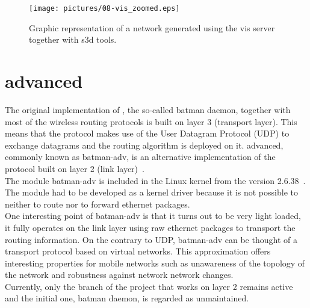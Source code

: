 \documentclass[a4paper]{article}
\begin{document}
\begin{figure}[!ht]
  \centering
  \texttt{[image: pictures/08-vis\_zoomed.eps]}
  \caption{Graphic representation of a network generated using the vis server
    together with s3d tools.}
  \label{fig:vis-server}
\end{figure}


\section{\batman  advanced}

The original implementation of \batman, the so-called batman daemon, together
with most of the wireless routing protocols is built on layer 3 (transport
layer). This means that the protocol makes use of the User Datagram Protocol 
(UDP) to exchange datagrams and the routing algorithm is deployed on it. 
\batman advanced, commonly known as batman-adv, is an alternative implementation 
of the protocol built on layer 2 (link layer)~\cite{batman-adv}.  \\

\vspace{2mm}
The module batman-adv is included in the Linux kernel from the version
2.6.38~\cite{batman-adv-kernel}. The module had to be developed as a kernel
driver because it is not possible to neither to route nor to forward ethernet
packages. \\

\vspace{2mm}
One interesting point of batman-adv is that it turns out to be very light
loaded, it fully operates on the link layer using raw ethernet packages to
transport the routing information. On the contrary to UDP, batman-adv can be
thought of a transport protocol based on virtual networks. This approximation
offers interesting properties for mobile networks such as unawareness of the
topology of the network and robustness against network network changes. \\

\vspace{2mm}
Currently, only the branch of the project that works on layer 2 remains active
and the initial one, batman daemon, is regarded as unmaintained.
\end{document}
